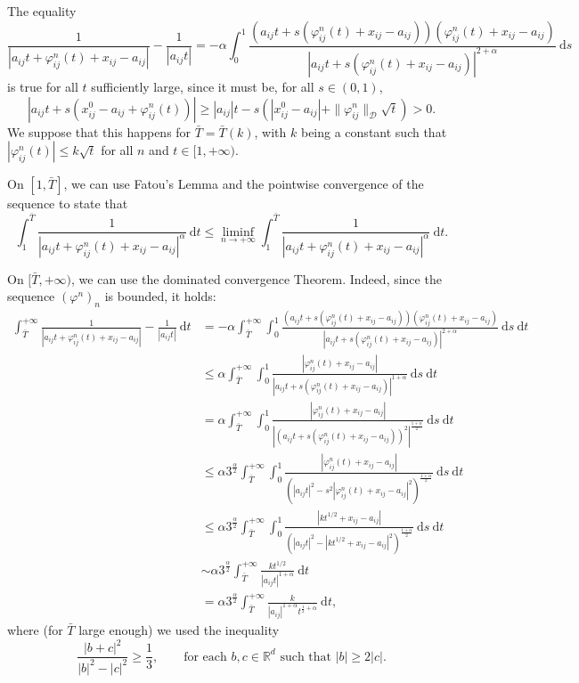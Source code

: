 \documentclass[a4paper,10pt]{amsart}
\newcommand{\ud}{\mathrm{d}}
\theoremstyle{plain}
\theoremstyle{definition}
\numberwithin{equation}{section}
\numberwithin{thm}{section}
\begin{document}
The equality
\[
    \frac{1}{|a_{ij}t+  \varphi^n_{ij}(t) +x_{ij} - a_{ij} |} - \frac{1}{|a_{ij}t|} = -\alpha\int_{0}^{1} \frac{(a_{ij}t + s(\varphi^n_{ij}(t) +x_{ij} - a_{ij}))(\varphi^n_{ij}(t) +x_{ij} - a_{ij})}{|a_{ij}t + s(\varphi^n_{ij}(t) +x_{ij} - a_{ij})|^{2+\alpha}}\ \ud s
\]
is true for all $t$ sufficiently large, since it must be, for all $s\in(0,1)$,
\[
|a_{ij}t + s(x^0_{ij} - a_{ij} + \varphi^n_{ij}(t))| \geq |a_{ij}|t - s(|x^0_{ij} - a_{ij}| + \|\varphi^n_{ij}\|_\mathcal{D}\sqrt{t}) >0.
\]
We suppose that this happens for $\bar T = \bar T(k)$, with $k$ being a constant such that $|\varphi^n_{ij}(t)| \leq k\sqrt{t}$ for all $n$ and $t\in[1,+\infty)$.

On $[1,\bar T]$, we can use Fatou's Lemma and the pointwise convergence of the sequence to state that
\[
\int_{1}^{\bar{T}} \frac{1}{|a_{ij}t + \varphi^n_{ij}(t) + x_{ij} - a_{ij}|^\alpha}\ \ud t \leq \liminf_{n\rightarrow+\infty} \int_{1}^{\bar{T}} \frac{1}{|a_{ij}t + \varphi^n_{ij}(t) + x_{ij} - a_{ij}|^\alpha}\ \ud t.
\]

On $[\bar T,+\infty)$, we can use the dominated convergence Theorem. Indeed, since the sequence $(\varphi^n)_n$ is bounded, it holds:
\[
\begin{aligned}
    \int_{\bar T}^{+\infty} \!\!\frac{1}{|a_{ij}t+  \varphi^n_{ij}(t) +x_{ij} - a_{ij} |} - \frac{1}{|a_{ij}t|}\ \ud t &= -\alpha\!\int_{\bar T}^{+\infty} \!\int_{0}^{1} \!\frac{(a_{ij}t + s(\varphi^n_{ij}(t) +x_{ij} - a_{ij}))(\varphi^n_{ij}(t) +x_{ij} - a_{ij})}{|a_{ij}t + s(\varphi^n_{ij}(t) +x_{ij} - a_{ij})|^{2+\alpha}}\ \ud s\ \ud t\\
    & \le \alpha\int_{\bar T}^{+\infty} \int_{0}^{1} \frac{|\varphi^n_{ij}(t) +x_{ij} - a_{ij}|}{|a_{ij}t + s(\varphi^n_{ij}(t) +x_{ij} - a_{ij})|^{1+\alpha}}\ \ud s\ \ud t\\
    & = \alpha\int_{\bar T}^{+\infty} \int_{0}^{1} \frac{|\varphi^n_{ij}(t) +x_{ij} - a_{ij}|}{|(a_{ij}t + s(\varphi^n_{ij}(t) +x_{ij} - a_{ij}))^2|^{\frac{1+\alpha}{2}}}\ \ud s\ \ud t\\
    & \le \alpha3^{\frac{\alpha}{2}}\int_{\bar T}^{+\infty} \int_{0}^{1} \frac{|\varphi^n_{ij}(t) +x_{ij} - a_{ij}|}{(|a_{ij}t|^2 - s^2|\varphi^n_{ij}(t) +x_{ij} - a_{ij}|^2)^{\frac{1+\alpha}{2}}}\ \ud s\ \ud t\\
    & \le \alpha3^{\frac{\alpha}{2}}\int_{\bar T}^{+\infty} \int_{0}^{1} \frac{|kt^{1/2} +x_{ij} - a_{ij}|}{(|a_{ij}t|^2 - |kt^{1/2} +x_{ij} - a_{ij}|^2)^{\frac{1+\alpha}{2}}}\ \ud s\ \ud t\\
    &\sim \alpha3^{\frac{\alpha}{2}}\int_{\bar T}^{+\infty} \frac{kt^{1/2}}{|a_{ij}t|^{1+\alpha}}\ \ud t \\
    & = \alpha3^{\frac{\alpha}{2}}\int_{\bar T}^{+\infty} \frac{k}{|a_{ij}|^{1+\alpha} t^{\frac{1}{2}+\alpha}}\ \ud t, 
\end{aligned}
\]
where (for $\bar T$ large enough) we used the inequality
\[
\frac{|b+c|^2}{|b|^2 - |c|^2} \geq \frac{1}{3}, \qquad \text{for each }b,c\in\mathbb{R}^d \text{ such that }|b|\geq2|c|.
\]
\end{document}
